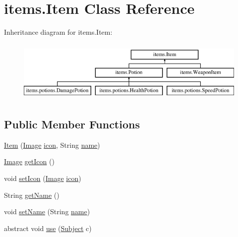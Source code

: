 \hypertarget{classitems_1_1_item}{}\section{items.\+Item Class Reference}
\label{classitems_1_1_item}
Inheritance diagram for items.\+Item\+:\begin{figure}[H]
\begin{center}
\leavevmode
\includegraphics[height=3.000000cm]{classitems_1_1_item}
\end{center}
\end{figure}
\subsection*{Public Member Functions}
\begin{DoxyCompactItemize}
\item 
\mbox{\hyperlink{classitems_1_1_item_a4c590ea0fc7a232106485d3b45a6c037}{Item}} (\mbox{\hyperlink{classorg_1_1newdawn_1_1slick_1_1_image}{Image}} \mbox{\hyperlink{classitems_1_1_item_afa445ad011d48c3455b0c04bec2581f9}{icon}}, String \mbox{\hyperlink{classitems_1_1_item_a086327df1ba046bbbe3fa2f753226d73}{name}})
\item 
\mbox{\hyperlink{classorg_1_1newdawn_1_1slick_1_1_image}{Image}} \mbox{\hyperlink{classitems_1_1_item_a61a856e9cd34dced660338643dcd77c6}{get\+Icon}} ()
\item 
void \mbox{\hyperlink{classitems_1_1_item_afa9c7e68e0aded0261c198baa252142c}{set\+Icon}} (\mbox{\hyperlink{classorg_1_1newdawn_1_1slick_1_1_image}{Image}} \mbox{\hyperlink{classitems_1_1_item_afa445ad011d48c3455b0c04bec2581f9}{icon}})
\item 
String \mbox{\hyperlink{classitems_1_1_item_a07354b033d3a7fc29ededaaaa36a917d}{get\+Name}} ()
\item 
void \mbox{\hyperlink{classitems_1_1_item_aff0a1e0692ec982287b25ee4528464cb}{set\+Name}} (String \mbox{\hyperlink{classitems_1_1_item_a086327df1ba046bbbe3fa2f753226d73}{name}})
\item 
abstract void \mbox{\hyperlink{classitems_1_1_item_a0829954625984ccd9f198c9be69e0302}{use}} (\mbox{\hyperlink{classentities_1_1_subject}{Subject}} c)
\end{DoxyCompactItemize}
